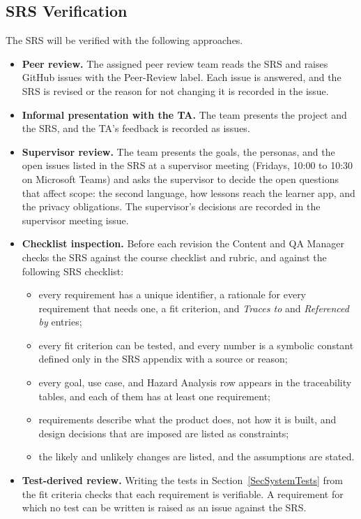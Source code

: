 \documentclass[12pt, titlepage]{article}
\begin{document}
\subsection{SRS Verification}

The SRS will be verified with the following approaches.

\begin{itemize}
  \item \textbf{Peer review.} The assigned peer review team reads the SRS and
        raises GitHub issues with the Peer-Review label. Each issue is
        answered, and the SRS is revised or the reason for not changing it is
        recorded in the issue.
  \item \textbf{Informal presentation with the TA.} The team presents the
        project and the SRS, and the TA's feedback is recorded as issues.
  \item \textbf{Supervisor review.} The team presents the goals, the
        personas, and the open issues listed in the SRS at a supervisor meeting
        (Fridays, 10:00 to 10:30 on Microsoft Teams) and asks the supervisor to
        decide the open questions that affect scope: the second language, how
        lessons reach the learner app, and the privacy obligations. The
        supervisor's decisions are recorded in the supervisor meeting issue.
  \item \textbf{Checklist inspection.} Before each revision the Content and QA
        Manager checks the SRS against the course checklist and rubric, and
        against the following SRS checklist:
        \begin{itemize}
          \item every requirement has a unique identifier, a rationale for
                every requirement that needs one, a fit criterion, and
                \emph{Traces to} and \emph{Referenced by} entries;
          \item every fit criterion can be tested, and every number is a
                symbolic constant defined only in the SRS appendix with a
                source or reason;
          \item every goal, use case, and Hazard Analysis row appears in the
                traceability tables, and each of them has at least one
                requirement;
          \item requirements describe what the product does, not how it is
                built, and design decisions that are imposed are listed as
                constraints;
          \item the likely and unlikely changes are listed, and the
                assumptions are stated.
        \end{itemize}
  \item \textbf{Test-derived review.} Writing the tests in
        Section~\ref{SecSystemTests} from the fit criteria checks that each
        requirement is verifiable. A requirement for which no test can be
        written is raised as an issue against the SRS.
\end{itemize}
\end{document}
